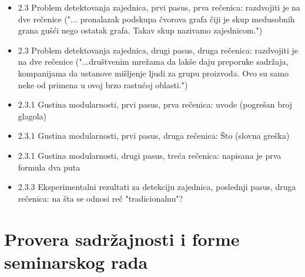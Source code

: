 \documentclass[a4paper]{report}
\begin{document}
\begin{itemize}
    \item 2.3 Problem detektovanja zajednica, prvi pasus, prva rečenica: razdvojiti je na dve rečenice ("... pronalazak podskupa čvorova grafa čiji je skup medusobnih grana gušći nego ostatak grafa. Takav skup nazivamo zajednicom.")
    \item 2.3 Problem detektovanja zajednica, drugi pasus, druga rečenica: razdvojiti je na dve rečenice ("...društvenim mrežama da lakše daju preporuke sadržaja, kompanijama da ustanove mišljenje ljudi za grupu proizvoda. Ovo su samo neke od primena u ovoj brzo rastućoj oblasti.")
    \item 2.3.1 Gustina modularnosti, prvi pasus, prva rečenica: uvode (pogrešan broj glagola)
    \item 2.3.1 Gustina modularnosti, prvi pasus, druga rečenica: Što (slovna greška)
    \item 2.3.1 Gustina modularnosti, drugi pasus, treća rečenica: napisana je prva formula dva puta
    \item 2.3.3 Eksperimentalni rezultati za detekciju zajednica, poslednji pasus, druga rečenica: na šta se odnosi reč "tradicionalnu"?
\end{itemize}


\section{Provera sadržajnosti i forme seminarskog rada}
\end{document}
